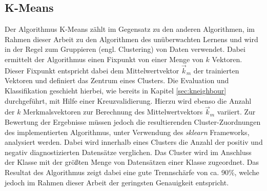 \subsection{K-Means}
Der Algorithmus K-Means zählt im Gegensatz zu den anderen Algorithmen, im Rahmen dieser Arbeit zu den Algorithmen des unüberwachten Lernens und wird in der Regel zum Gruppieren (engl. \glqq Clustering\grqq) von Daten verwendet. Dabei ermittelt der Algorithmus einen Fixpunkt von einer Menge von $k$ Vektoren. Dieser Fixpunkt entspricht dabei dem Mittelwertvektor $\vec{k}_m$ der trainierten Vektoren und definiert das Zentrum eines Clusters.
Die Evaluation und Klassifikation geschieht hierbei, wie bereits in Kapitel \ref{sec:kneighbour} durchgeführt, mit Hilfe einer Kreuzvalidierung. Hierzu wird ebenso die Anzahl der $k$ Merkmalsvektoren zur Berechnung des Mittelwertvektors $\vec{k}_m$ variiert. 
Zur Bewertung der Ergebnisse müssen jedoch die resultierenden Cluster-Zuordnungen des implementierten Algorithmus, unter Verwendung des \textit{sklearn} Frameworks, analysiert werden. Dabei wird innerhalb eines Clusters die Anzahl der positiv und negativ diagnostizierten Datensätze verglichen. Das Cluster wird im Anschluss der Klasse mit der größten Menge von Datensätzen einer Klasse zugeordnet.
Das Resultat des Algorithmus zeigt dabei eine gute Trennschärfe von ca. 90\%, welche jedoch im Rahmen dieser Arbeit der geringsten Genauigkeit entspricht.